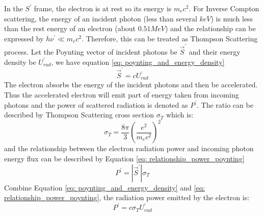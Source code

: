 \documentclass[12pt]{report}
\begin{document}
            In the $S^{\prime}$ frame, the electron is at rest so its energy is $m_e c^2$. 
            For Inverse Compton scattering, the energy of an incident photon (less than several $keV$) 
            is much less than the rest energy of an electron (about $0.51MeV$) 
            and the relationship can be expressed by 
            $h\nu^{\prime} \ll m_e c^2$. Therefore, this can be treated as Thompson Scattering process. 
            Let the Poynting vector of incident photons be $\vec{S}^{\prime}$ and their energy density 
            be $U_{rad}^{\prime}$, we have equation \ref{eq: poynting_and_energy_density}
            \begin{equation}
              \label{eq: poynting_and_energy_density}
              \vec{S}^{\prime} = c U_{rad}^{\prime}
            \end{equation}
            The electron absorbs the energy of the incident photons and then be accelerated. Thus the 
            accelerated electron will emit part of energy taken from incoming photons and the power of 
            scattered radiation is denoted as $P^{\prime}$.
            The ratio can be described by Thompson Scattering cross section $\sigma_{T}$ which is:
            \begin{equation}
              \label{eq: thompson_cross_section}
              \sigma_{T} = \frac{8\pi}{3} \left(\frac{e^2}{m_e c^2}\right)^2
            \end{equation}
            and the relationship between the electron radiation power and incoming photon energy flux can be 
            described by Equation \ref{eq: relationship_power_poynting}
            \begin{equation}
              \label{eq: relationship_power_poynting}
              P^{\prime} = \left| \vec{S}^{\prime} \right| \sigma_{T}
            \end{equation}
            Combine Equation \ref{eq: poynting_and_energy_density} and \ref{eq: relationship_power_poynting},
            the radiation power emitted by the electron is: 
            \begin{equation}
              \label{eq: final_relationship}
              P^{\prime} = c \sigma_{T} U^{\prime}_{rad}
            \end{equation}
\end{document}

